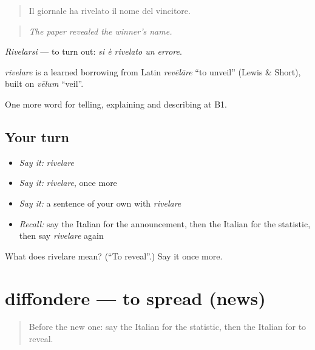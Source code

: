 \begin{quote}
Il giornale ha rivelato il nome del vincitore.
\end{quote}

\begin{quote}
\emph{The paper revealed the winner's name.}
\end{quote}

\emph{Rivelarsi} — to turn out: \emph{si è rivelato un errore}.

\begin{cousinweb}
\emph{rivelare} is a learned borrowing from Latin \emph{revēlāre} \textquotedblleft{}to unveil\textquotedblright{} (Lewis \& Short), built on \emph{vēlum} \textquotedblleft{}veil\textquotedblright{}.
\end{cousinweb}

\begin{grammarlens}[title={What you've built}]
One more word for telling, explaining and describing at B1.
\end{grammarlens}

\subsection*{Your turn}
\begin{itemize}
\raggedright
  \item \emph{Say it:} \emph{rivelare}
  \item \emph{Say it:} \emph{rivelare}, once more
  \item \emph{Say it:} a sentence of your own with \emph{rivelare}
  \item \emph{Recall:} say the Italian for the announcement, then the Italian for the statistic, then say \emph{rivelare} again
\end{itemize}

\begin{tcolorbox}[breakable,colback=teal!4,colframe=teal!35!black,title={Before you move on}]
What does rivelare mean? (\textquotedblleft{}To reveal\textquotedblright{}.) Say it once more.
\end{tcolorbox}
\section[diffondere]{diffondere — to spread (news)}

\label{lesson:IT-C288-diffondere}



\begin{quote}
Before the new one: say the Italian for the statistic, then the Italian for to reveal.
\end{quote}

